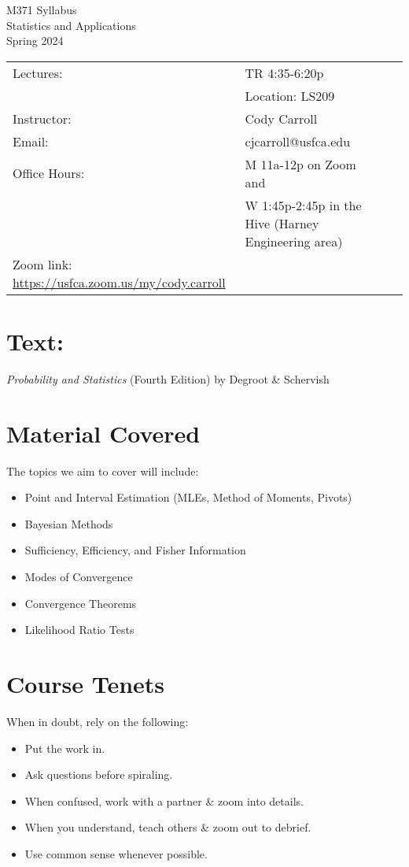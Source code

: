 \documentclass[10pt, oneside]{article}
\begin{document}
\begin{center} \Large{M371 Syllabus\\
		Statistics and Applications\\Spring 2024} \end{center} 
\begin{table}[ht]
\begin{tabular}{llll}
 Lectures:&  TR 4:35-6:20p	\\
 & Location: LS209 \\ 
 Instructor: & Cody Carroll &  \\
 Email:  & cjcarroll@usfca.edu & \\ 
 Office Hours: & M 11a-12p on Zoom and \\
 & W 1:45p-2:45p in the Hive (Harney Engineering area) \\
 Zoom link: \url{https://usfca.zoom.us/my/cody.carroll}\\
\end{tabular}
\end{table}

\section*{Text:} 
\textit{Probability and Statistics} (Fourth Edition) by Degroot \& Schervish
\renewcommand\labelitemi{$\vcenter{\hbox{\tiny$\blacksquare$}}$}
\section*{Material Covered}
The topics we aim to cover will include:
\begin{itemize}
	\itemsep0em
	\item Point and Interval Estimation (MLEs, Method of Moments, Pivots)
	\item Bayesian Methods
	\item Sufficiency, Efficiency, and Fisher Information
	\item Modes of Convergence
	\item Convergence Theorems
	\item Likelihood Ratio Tests 
\end{itemize}

\section*{Course Tenets}
When in doubt, rely on the following:
\begin{itemize}
	\itemsep0em
	\item Put the work in.
	\item Ask questions before spiraling.
	\item When confused, work with a partner \& zoom into details.
	\item When you understand, teach others \& zoom out to debrief.
	\item Use common sense whenever possible.
\end{itemize}
\end{document}
